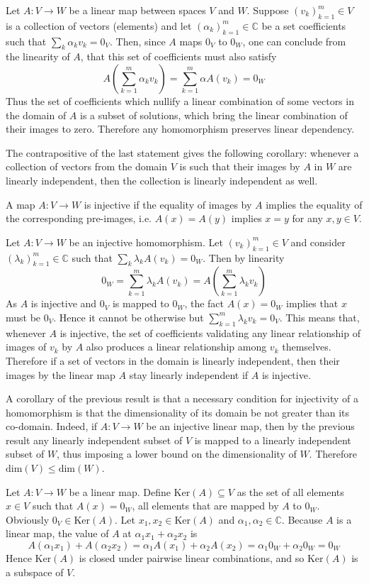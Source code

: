 \documentclass[a4paper]{article}
\newcommand{\brac}[1]{\ensuremath{\left( #1 \right)}}
\newcommand{\Dim}[1]{\ensuremath{\text{dim}\brac{ #1 }}}
\newcommand{\Ker}[1]{\ensuremath{\text{Ker}\brac{ #1 }}}
\begin{document}
Let $A:V\to W$ be a linear map between spaces $V$ and $W$. Suppose $\brac{v_k}_{k=1}^m \in V$ is a collection of vectors (elements) and let $\brac{\alpha_k}_{k=1}^m \in \mathbb{C}$ be a set coefficients such that $\sum_k \alpha_k v_k = 0_V$. Then, since $A$ maps $0_V$ to $0_W$, one can conclude from the linearity of $A$, that this set of coefficients must also satisfy \[A\brac{\sum_{k=1}^m \alpha_k v_k} = \sum_{k=1}^m \alpha A\brac{v_k} = 0_W\] Thus the set of coefficients which nullify a linear combination of some vectors in the domain of $A$ is a subset of solutions, which bring the linear combination of their images to zero. Therefore any homomorphism preserves linear dependency.

The contrapositive of the last statement gives the following corollary: whenever a collection of vectors from the domain $V$ is such that their images by $A$ in $W$ are linearly independent, then the collection is linearly independent as well.

A map $A:V\to W$ is injective if the equality of images by $A$ implies the equality of the corresponding pre-images, i.e. $A\brac{x}=A\brac{y}$ implies $x = y$ for any $x, y \in V$.

Let $A:V \to W$ be an injective homomorphism. Let $\brac{v_k}_{k=1}^m \in V$ and consider $\brac{\lambda_k}_{k=1}^m \in \mathbb{C}$ such that $\sum_k \lambda_k A\brac{v_k} = 0_W$. Then by linearity \[0_W = \sum_{k=1}^m \lambda_k A\brac{v_k} = A\brac{\sum_{k=1}^m \lambda_k v_k}\] As $A$ is injective and $0_V$ is mapped to $0_W$, the fact $A\brac{x} = 0_W$ implies that $x$ must be $0_V$. Hence it cannot be otherwise but $\sum_{k=1}^m \lambda_k v_k = 0_V$. This means that, whenever $A$ is injective, the set of coefficients validating any linear relationship of images of $v_k$ by $A$ also produces a linear relationship among $v_k$ themselves. Therefore if a set of vectors in the domain is linearly independent, then their images by the linear map $A$ stay linearly independent if $A$ is injective.

A corollary of the previous result is that a necessary condition for injectivity of a homomorphism is that the dimensionality of its domain be not greater than its co-domain. Indeed, if $A:V\to W$ be an injective linear map, then by the previous result any linearly independent subset of $V$ is mapped to a linearly independent subset of $W$, thus imposing a lower bound on the dimensionality of $W$. Therefore $\Dim{V} \leq \Dim{W}$.

Let $A:V\to W$ be a linear map. Define $\Ker{A}\subseteq V$ as the set of all elements $x \in V$ such that $A\brac{x} = 0_W$, all elements that are mapped by $A$ to $0_W$. Obviously $0_V\in \Ker{A}$. Let $x_1, x_2 \in \Ker{A}$ and $\alpha_1, \alpha_2\in \mathbb{C}$. Because $A$ is a linear map, the value of $A$ at $\alpha_1 x_1 + \alpha_2 x_2$ is\[A\brac{\alpha_1 x_1}+A\brac{\alpha_2 x_2} = \alpha_1 A\brac{x_1} + \alpha_2 A\brac{x_2} =  \alpha_1 0_W + \alpha_2 0_W = 0_W\] Hence $\Ker{A}$ is closed under pairwise linear combinations, and so $\Ker{A}$ is a subspace of $V$.
\end{document}
